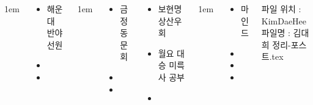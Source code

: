 \documentclass[	20pt, 
							a0paper, 
							landscape,
							margin=0mm, %
							innermargin=10mm,  		%
							blockverticalspace=4mm, %
							colspace=5mm, 
							subcolspace=0mm
							]{tikzposter}
\begin{document}
\begin{columns}

			{
					\setlength{\leftmargini}{4em}
					\setlength{\labelsep} {1em}
				\begin{LARGE}
					\begin{itemize}
					\item 해운대 반야선원
					\item 
					\item 
					\end{itemize}
				\end{LARGE}
			} %


			{
					\setlength{\leftmargini}{4em}
					\setlength{\labelsep} {1em}
				\begin{LARGE}
					\begin{itemize}
					\item 금정 동문회
					\item 
					\item 
					\end{itemize}
				\end{LARGE}
			} %


			{
				\begin{LARGE}
					\begin{itemize}
					\item 보현명상산우회
					\item 월요 대승 미륵사 공부 
					\item 
					\end{itemize}
				\end{LARGE}
			} %




			{
					\setlength{\leftmargini}{3em}
					\setlength{\labelsep} {1em}
				\begin{LARGE}
					\begin{itemize}
					\item 마인드 
					\item 
					\item 
					\item 
					\end{itemize}
				\end{LARGE}
파일 위치 : KimDaeHee\\
파일명 : 김대희 정리-포스트.tex
			} %






	\end{columns}
\end{document}
